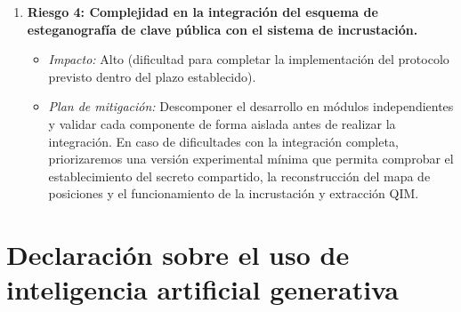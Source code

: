 \documentclass[IB]{TFUOC}%
\begin{document}
\begin{enumerate}
\item \textbf{Riesgo 4: Complejidad en la integración del esquema de esteganografía de clave pública con el sistema de incrustación.}
\begin{itemize}
    \item \textit{Impacto:} Alto (dificultad para completar la implementación del protocolo previsto dentro del plazo establecido).
    \item \textit{Plan de mitigación:} Descomponer el desarrollo en módulos independientes y validar cada componente de forma aislada antes de realizar la integración. En caso de dificultades con la integración completa, priorizaremos una versión experimental mínima que permita comprobar el establecimiento del secreto compartido, la reconstrucción del mapa de posiciones y el funcionamiento de la incrustación y extracción QIM.
\end{itemize}

\end{enumerate}







\section{Declaración sobre el uso de inteligencia artificial generativa}
\end{document}
